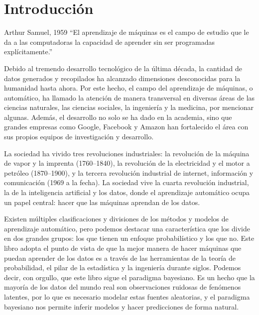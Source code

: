 \chapter{Introducción}

\begin{chapquote}{Arthur Samuel, 1959}
	``El aprendizaje de máquinas es el campo de estudio que le da a las computadoras la capacidad de aprender sin ser programadas explícitamente.''
\end{chapquote}



Debido al tremendo desarrollo tecnológico de la última década, la cantidad de datos generados y recopilados ha alcanzado dimensiones desconocidas para la humanidad hasta ahora. Por este hecho, el campo del aprendizaje de máquinas, o automático, ha llamado la atención de manera transversal en diversas áreas de las ciencias naturales, las ciencias sociales, la ingeniería y la medicina, por mencionar algunas. Además, el desarrollo no solo se ha dado en la academia, sino que grandes empresas como Google, Facebook y Amazon han fortalecido el área con sus propios equipos de investigación y desarrollo. 

La sociedad ha vivido tres revoluciones industriales: la revolución de la máquina de vapor y la imprenta (1760--1840), la revolución de la electricidad y el motor a petróleo (1870--1900), y la tercera revolución industrial de internet, información y comunicación (1969 a la fecha). La sociedad vive la cuarta revolución industrial, la de la inteligencia artificial y los datos, donde el aprendizaje automático ocupa un papel central: hacer que las máquinas aprendan de los datos.

Existen múltiples clasificaciones y divisiones de los métodos y modelos de aprendizaje automático, pero podemos destacar una característica que los divide en dos grandes grupos: los que tienen un enfoque probabilístico y los que no. Este libro adopta el punto de vista de que la mejor manera de hacer máquinas que puedan aprender de los datos es a través de las herramientas de la teoría de probabilidad, el pilar de la estadística y la ingeniería durante siglos. Podemos decir, con orgullo, que este libro sigue el paradigma bayesiano. Es un hecho que la mayoría de los datos del mundo real son observaciones ruidosas de fenómenos latentes, por lo que es necesario modelar estas fuentes aleatorias, y el paradigma bayesiano nos permite inferir modelos y hacer predicciones de forma natural.

